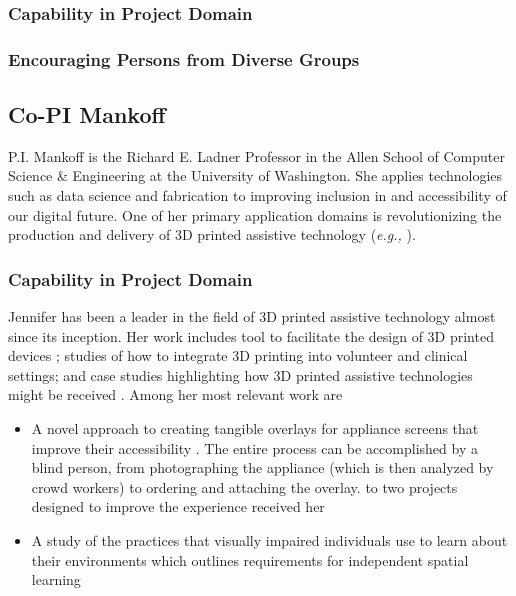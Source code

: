 


\subsubsection{Capability in Project Domain}
\subsubsection{Encouraging Persons from Diverse Groups}

\subsection{Co-PI Mankoff}
P.I. Mankoff is the Richard E. Ladner Professor in the Allen School of Computer Science & Engineering 
at the University of Washington. She applies technologies such as data science and fabrication to 
improving inclusion in and accessibility of our digital future.  One of her primary application domains 
is revolutionizing the production and delivery of 3D printed assistive technology (\textit{e.g.,} \cite{Mankoff:2018:consumer,Hofmann:2016:HelpingHands,Chen:2016:Reprise}).

\subsubsection{Capability in Project Domain}
Jennifer has been a leader in the field of 3D printed assistive technology almost since its inception. Her work includes tool to facilitate the design of 3D printed devices \cite{Hofmann:2016:HelpingHands,Chen:2016:Reprise}; studies of how to integrate 3D printing into volunteer \cite{Parry-Hill:2017:Fabricators5} and clinical \cite{Hofmann:2016:Clinical} settings; and case studies highlighting how 3D printed assistive technologies might be received \cite{Hofmann:2016:HelpingHands}. Among her most relevant work are 
\begin{itemize}
    \item  A novel approach to creating tangible overlays for appliance screens that improve their accessibility \cite{Guo:2017:Facade}. The entire process can be accomplished by a blind person, from photographing the appliance (which is then analyzed by crowd workers) to ordering and attaching the overlay.  to two projects designed to improve the experience received her 
\item A study of the practices that visually impaired individuals use to learn about their environments which outlines requirements for independent spatial learning \cite{Banovic:2013:spatial}
\end{itemize}

